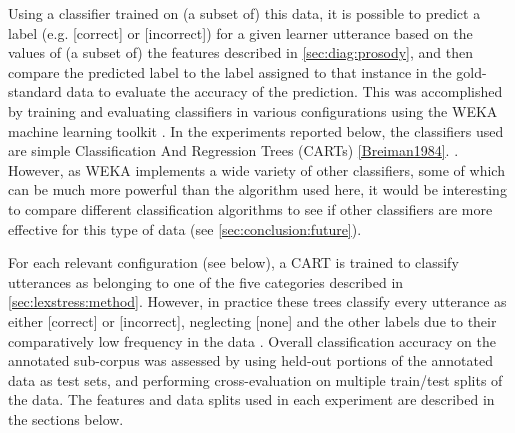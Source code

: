 		 Using a classifier trained on (a subset of) this data, it is possible to predict a label (e.g. [correct] or [incorrect]) for a given learner utterance based on the values of (a subset of) the features described in \cref{sec:diag:prosody}, and then compare the predicted label to the label assigned to that instance in the gold-standard data to evaluate the accuracy of the prediction. 
		This was accomplished by training and evaluating classifiers in various configurations using the WEKA machine learning toolkit \citep{Hall2009}. 	
		In the experiments reported below, 
		the classifiers used are
		simple Classification And Regression Trees (CARTs) \cref{Breiman1984}. 
		. 
		However, as WEKA implements a wide variety of other classifiers, some of which can be much more powerful than the algorithm used here, it would be interesting to compare different classification algorithms to see if other classifiers are more effective for this type of data (see \cref{sec:conclusion:future}).
		
		For each relevant configuration (see below), a CART is trained to classify utterances as belonging to one of the five categories described in \cref{sec:lexstress:method}. However, in practice these trees classify every utterance as either [correct] or [incorrect], neglecting [none] and the other labels due to their comparatively low frequency in the data .
		Overall classification accuracy on the annotated sub-corpus was assessed by using held-out portions of the annotated data as test sets, and performing cross-evaluation on multiple train/test splits of the data. The features and data splits used in each experiment are described in the sections below. 


